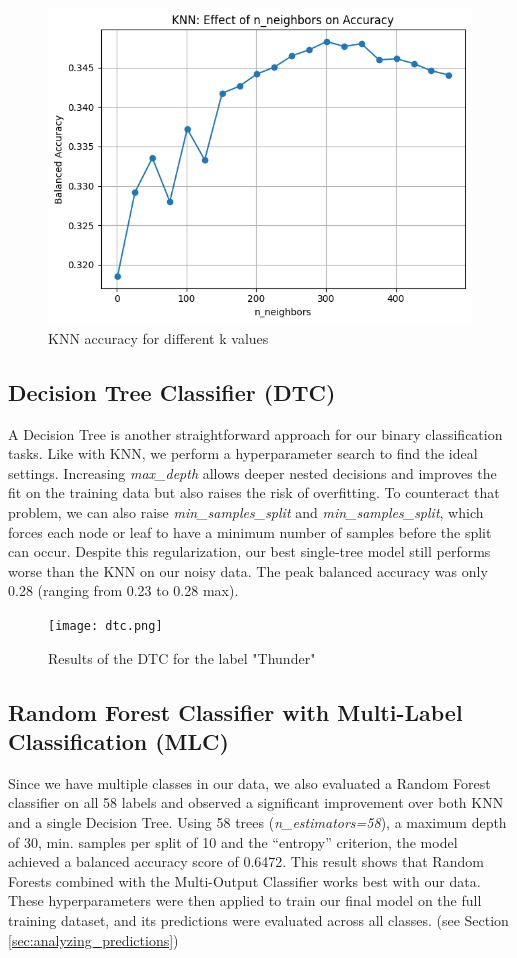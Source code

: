 \documentclass{article}
\begin{document}
\begin{figure}[H]
  \centering
  \includegraphics[width=0.60\linewidth]{knn_performance.png}
  \caption{KNN accuracy for different k values}
  \label{fig4}
\end{figure}

\subsection{Decision Tree Classifier (DTC)}
A Decision Tree is another straightforward approach for our binary classification tasks. Like with KNN, we perform a hyperparameter search to find the ideal settings. Increasing \textit{max\_depth} allows deeper nested decisions and improves the fit on the training data but also raises the risk of overfitting. To counteract that problem, we can also raise \textit{min\_samples\_split} and \textit{min\_samples\_split}, which forces each node or leaf to have a minimum number of samples before the split can occur. Despite this regularization, our best single-tree model still performs worse than the KNN on our noisy data. The peak balanced accuracy was only 0.28 (ranging from 0.23 to 0.28 max).

\begin{figure}[H]
  \centering
  \texttt{[image: dtc.png]}
  \caption{Results of the DTC for the label "Thunder"}
  \label{fig5}
\end{figure}

\subsection{Random Forest Classifier with Multi-Label Classification (MLC)}
Since we have multiple classes in our data, we also evaluated a Random Forest classifier on all 58 labels and observed a significant improvement over both KNN and a single Decision Tree. Using 58 trees (\textit{n\_estimators=58}), a maximum depth of 30, min. samples per split of 10 and the “entropy” criterion, the model achieved a balanced accuracy score of 0.6472. This result shows that Random Forests combined with the Multi-Output Classifier works best with our data.\\
These hyperparameters were then applied to train our final model on the full training dataset, and its predictions were evaluated across all classes. (see Section \ref{sec:analyzing_predictions})
\end{document}
